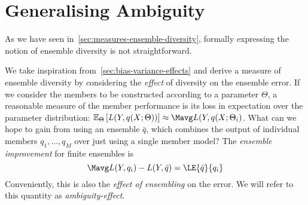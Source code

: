 \documentclass[../main.tex]{subfiles}
\begin{document}
\section{Generalising Ambiguity} 


As we have seen in~\ref{sec:measures-ensemble-diversity}, formally expressing the notion of ensemble diversity is not straightforward. 

We take inspiration from~\ref{sec:bias-variance-effects} and derive a measure of ensemble diversity by considering the \textit{effect} of diversity on the ensemble error.
If we consider the members to be constructed according to a parameter $\Theta$, a reasonable measure of the member performance is its loss in expectation over the parameter distribution: $\mathbb{E}_{\Theta}\left[ L(Y, q(X; \Theta))  \right] \approx \Mavg L(Y, q(X;\Theta_{i})$.
What can we hope to gain from using an ensemble $\bar{q}$, which combines the output of individual members $q_{1}, \dots, q_{M}$ over just using a single member model? 
The \textit{ensemble improvement} for finite ensembles is 
$$
\Mavg L(Y, q_{i}) - L(Y, \bar{q}) = \LE{\bar{q}}{q_i}
$$
Conveniently, this is also the \textit{effect of ensembling} on the error. We will refer to this quantity as \textit{ambiguity-effect}.



%     
\end{document}
